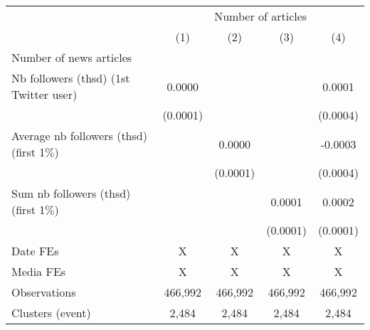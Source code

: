 {
\def\sym#1{\ifmmode^{#1}\else\(^{#1}\)\fi}
\begin{tabular}{l*{4}{c}}
\hline\hline
                    &\multicolumn{4}{c}{Number of articles}                                                 \\\cmidrule(lr){2-5}
                    &\multicolumn{1}{c}{(1)}         &\multicolumn{1}{c}{(2)}         &\multicolumn{1}{c}{(3)}         &\multicolumn{1}{c}{(4)}         \\
\hline
Number of news articles&                     &                     &                     &                     \\
Nb followers (thsd) (1st Twitter user)&      0.0000         &                     &                     &      0.0001         \\
                    &    (0.0001)         &                     &                     &    (0.0004)         \\
Average nb followers (thsd) (first 1$\%$)&                     &      0.0000         &                     &     -0.0003         \\
                    &                     &    (0.0001)         &                     &    (0.0004)         \\
Sum nb followers (thsd) (first 1$\%$)&                     &                     &      0.0001         &      0.0002         \\
                    &                     &                     &    (0.0001)         &    (0.0001)         \\
\hline
Date FEs            &           X         &           X         &           X         &           X         \\
Media FEs           &           X         &           X         &           X         &           X         \\
Observations        &     466,992         &     466,992         &     466,992         &     466,992         \\
Clusters (event)    &       2,484         &       2,484         &       2,484         &       2,484         \\
\hline\hline
\end{tabular}
}
